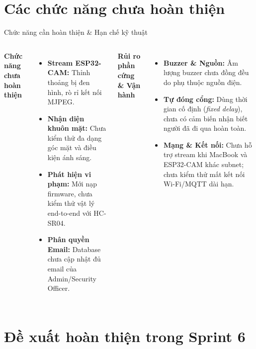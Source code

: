 \documentclass[aspectratio=169]{beamer}
\begin{document}
\section{Các chức năng chưa hoàn thiện}

\begin{frame}{Chức năng cần hoàn thiện \& Hạn chế kỹ thuật}
  \begin{columns}[T]
      \textbf{Chức năng chưa hoàn thiện}
      \begin{itemize}
        \item \textbf{Stream ESP32-CAM:} Thỉnh thoảng bị đen hình, rò rỉ kết nối MJPEG.
        \item \textbf{Nhận diện khuôn mặt:} Chưa kiểm thử đa dạng góc mặt và điều kiện ánh sáng.
        \item \textbf{Phát hiện vi phạm:} Mới nạp firmware, chưa kiểm thử vật lý end-to-end với HC-SR04.
        \item \textbf{Phân quyền Email:} Database chưa cập nhật đủ email của Admin/Security Officer.
      \end{itemize}

      \textbf{Rủi ro phần cứng \& Vận hành}
      \begin{itemize}
        \item \textbf{Buzzer \& Nguồn:} Âm lượng buzzer chưa đồng đều do phụ thuộc nguồn điện.
        \item \textbf{Tự đóng cổng:} Dùng thời gian cố định (\textit{fixed delay}), chưa có cảm biến nhận biết người đã đi qua hoàn toàn.
        \item \textbf{Mạng \& Kết nối:} Chưa hỗ trợ stream khi MacBook và ESP32-CAM khác subnet; chưa kiểm thử mất kết nối Wi-Fi/MQTT dài hạn.
      \end{itemize}
  \end{columns}
\end{frame}

\section{Đề xuất hoàn thiện trong Sprint 6}
\end{document}
